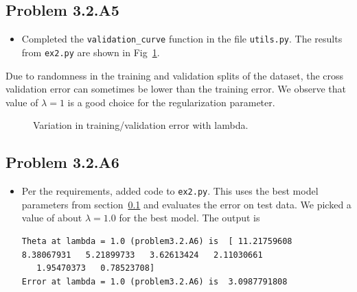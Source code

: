 \documentclass{article}
\begin{document}
\subsection{Problem 3.2.A5}
\label{3.2.A5}
\begin{itemize}
\item Completed the \verb|validation_curve| function in the file \verb|utils.py|. The results from \verb|ex2.py| are shown
  in Fig~\ref{fig:12}.
\end{itemize}
Due to randomness in the training and validation splits of the dataset, the cross validation error can sometimes be lower 
than the training error.
We observe that value of $\lambda=1$ is a good choice for the regularization parameter.
\begin{figure}[h]
  \caption{Variation in training/validation error with lambda.}\label{fig:12}
\end{figure}

\subsection{Problem 3.2.A6}
\begin{itemize}
\item Per the requirements, added code to \verb|ex2.py|. This uses the best model parameters from section~\ref{3.2.A5} and
  evaluates the error on test data. We picked a value of about $\lambda=1.0$ for the best model.
  The output is
\begin{verbatim}
Theta at lambda = 1.0 (problem3.2.A6) is  [ 11.21759608   8.38067931   5.21899733   3.62613424   2.11030661
   1.95470373   0.78523708]
Error at lambda = 1.0 (problem3.2.A6) is  3.0987791808
\end{verbatim}
\end{itemize}
\end{document}
